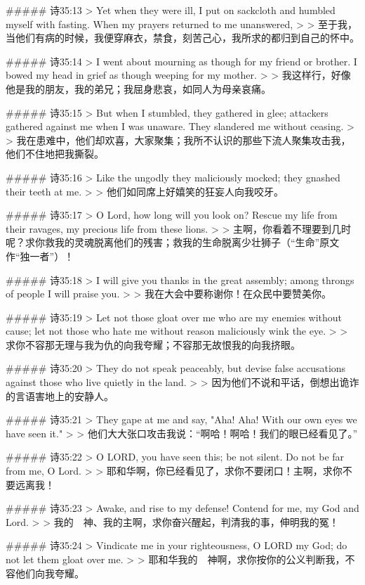 ##### 诗35:13
> Yet when they were ill, I put on sackcloth and humbled myself with fasting. When my prayers returned to me unanswered,
>
> 至于我，当他们有病的时候，我便穿麻衣，禁食，刻苦己心，我所求的都归到自己的怀中。


##### 诗35:14
> I went about mourning as though for my friend or brother. I bowed my head in grief as though weeping for my mother.
>
> 我这样行，好像他是我的朋友，我的弟兄；我屈身悲哀，如同人为母亲哀痛。


##### 诗35:15
> But when I stumbled, they gathered in glee; attackers gathered against me when I was unaware. They slandered me without ceasing.
>
> 我在患难中，他们却欢喜，大家聚集；我所不认识的那些下流人聚集攻击我，他们不住地把我撕裂。


##### 诗35:16
> Like the ungodly they maliciously mocked; they gnashed their teeth at me.
>
> 他们如同席上好嬉笑的狂妄人向我咬牙。


##### 诗35:17
> O Lord, how long will you look on? Rescue my life from their ravages, my precious life from these lions.
>
> 主啊，你看着不理要到几时呢？求你救我的灵魂脱离他们的残害；救我的生命脱离少壮狮子（“生命”原文作“独一者”）！


##### 诗35:18
> I will give you thanks in the great assembly; among throngs of people I will praise you.
>
> 我在大会中要称谢你！在众民中要赞美你。


##### 诗35:19
> Let not those gloat over me who are my enemies without cause; let not those who hate me without reason maliciously wink the eye.
>
> 求你不容那无理与我为仇的向我夸耀；不容那无故恨我的向我挤眼。


##### 诗35:20
> They do not speak peaceably, but devise false accusations against those who live quietly in the land.
>
> 因为他们不说和平话，倒想出诡诈的言语害地上的安静人。


##### 诗35:21
> They gape at me and say, "Aha! Aha! With our own eyes we have seen it."
>
> 他们大大张口攻击我说：“啊哈！啊哈！我们的眼已经看见了。”


##### 诗35:22
> O LORD, you have seen this; be not silent. Do not be far from me, O Lord.
>
> 耶和华啊，你已经看见了，求你不要闭口！主啊，求你不要远离我！


##### 诗35:23
> Awake, and rise to my defense! Contend for me, my God and Lord.
>
> 我的　神、我的主啊，求你奋兴醒起，判清我的事，伸明我的冤！


##### 诗35:24
> Vindicate me in your righteousness, O LORD my God; do not let them gloat over me.
>
> 耶和华我的　神啊，求你按你的公义判断我，不容他们向我夸耀。


